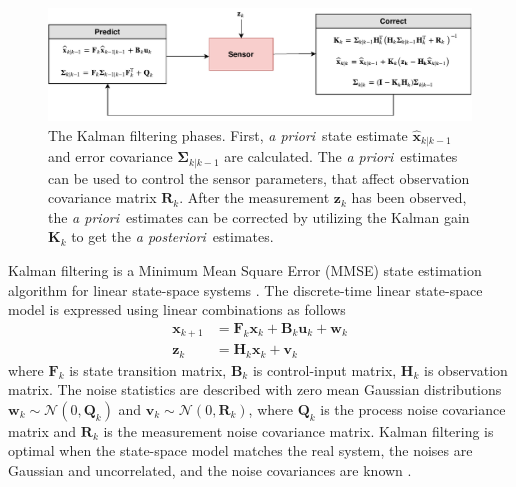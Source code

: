 \documentclass[english, 12pt, a4paper, elec, utf8, a-1b, online]{aaltothesis}
\renewcommand{\vec}[1]{\mathbf{#1}}
\newcommand{\xprior}{\hat{\vec{x}}_{k|k-1}}
\newcommand{\priorecov}{\boldsymbol{\Sigma}_{k|k-1}}
\newcommand{\x}{\vec{x}_k}
\newcommand{\xnext}{\vec{x}_{k+1}}
\newcommand{\z}{\vec{z}_k}
\newcommand{\stmodel}{\vec{F}_k}
\newcommand{\cimodel}{\vec{B}_k}
\newcommand{\cinput}{\vec{u}_k}
\newcommand{\pnoise}{\vec{w}_k}
\newcommand{\omodel}{\vec{H}_k}
\newcommand{\onoise}{\vec{v}_k}
\newcommand{\ocov}{\vec{R}_k}
\newcommand{\pcov}{\vec{Q}_k}
\newcommand{\gain}{\vec{K}_k}
\newcommand{\normal}[2]{\mathcal{N}\left(#1, #2 \right)}
\def\prior{\textit{a priori}\ }
\def\post{\textit{a posteriori}\ }
\begin{document}
\begin{figure}[b]
    \centering
    \includegraphics[width=\textwidth]{figures/KF.pdf}
    \caption{The Kalman filtering phases.
    First, \prior state estimate $\xprior$ and error covariance $\priorecov$ are calculated.
    The \prior estimates can be used to control the sensor parameters, that affect observation covariance matrix $\ocov$.
    After the measurement $\z$ has been observed, the \prior estimates can be corrected by utilizing the Kalman gain $\gain$ to get the \post estimates.
    }
    \label{fig:KF}
\end{figure}

Kalman filtering is a Minimum Mean Square Error (MMSE) state estimation algorithm for linear state-space systems \cite{Zarchan2000}.
The discrete-time linear state-space model is expressed using linear combinations as follows \cite{Zarchan2000}
\begin{align}
    \xnext &= \stmodel \x + \cimodel \cinput + \pnoise \label{eq:lsp_state} \\
    \z &= \omodel \x + \onoise \label{eq:lsp_obs}
\end{align}
where $\stmodel$ is state transition matrix, $\cimodel$ is control-input matrix, $ \omodel $ is observation matrix. 
The noise statistics are described with zero mean Gaussian distributions $\pnoise \sim \normal{0}{\pcov}$ and $\onoise \sim \normal{0}{\ocov}$, where $\pcov$ is the process noise covariance matrix and $\ocov$ is the measurement noise covariance matrix.
Kalman filtering is optimal when the state-space model matches the real system, the noises are Gaussian and uncorrelated, and the noise covariances are known \cite{Krishnamurthy2016}.
\end{document}
